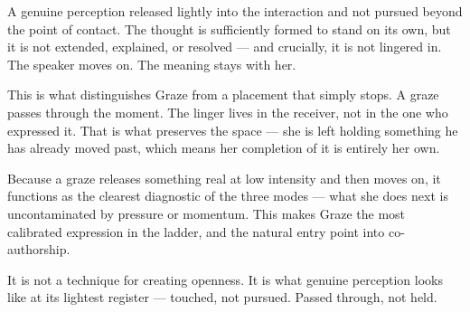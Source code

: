 A genuine perception released lightly into the interaction and not 
pursued beyond the point of contact. The thought is sufficiently 
formed to stand on its own, but it is not extended, explained, or 
resolved --- and crucially, it is not lingered in. The speaker 
moves on. The meaning stays with her.

This is what distinguishes Graze from a placement that simply 
stops. A graze passes through the moment. The linger lives in the 
receiver, not in the one who expressed it. That is what preserves 
the space --- she is left holding something he has already moved 
past, which means her completion of it is entirely her own.

Because a graze releases something real at low intensity and then 
moves on, it functions as the clearest diagnostic of the three 
modes --- what she does next is uncontaminated by pressure or 
momentum. This makes Graze the most calibrated expression in the 
ladder, and the natural entry point into co-authorship.

It is not a technique for creating openness. It is what genuine 
perception looks like at its lightest register --- touched, not 
pursued. Passed through, not held.

